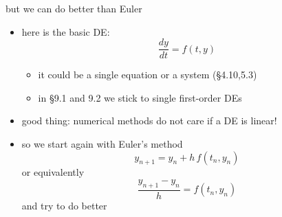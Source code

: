 \documentclass[urlcolor=blue,dvipsnames]{beamer}
\begin{document}
\begin{frame}{but we can do better than Euler}

\begin{itemize}
\item here is the basic DE:
    $$\frac{dy}{dt} = f(t,y)$$

\vspace{-2mm}
    \begin{itemize}
    \item it could be a single equation or a system (\S4.10,5.3)
    \item in \S9.1 and 9.2 we stick to single first-order DEs
    \end{itemize}
\item good thing: numerical methods do not care if a DE is linear!
\item so we start again with Euler's method
    $$y_{n+1} = y_n + h\, f(t_n,y_n)$$
or equivalently
    $$\frac{y_{n+1} - y_n}{h} = f(t_n,y_n)$$
and \alert{try to do better}
\end{itemize}
\end{frame}
\end{document}
